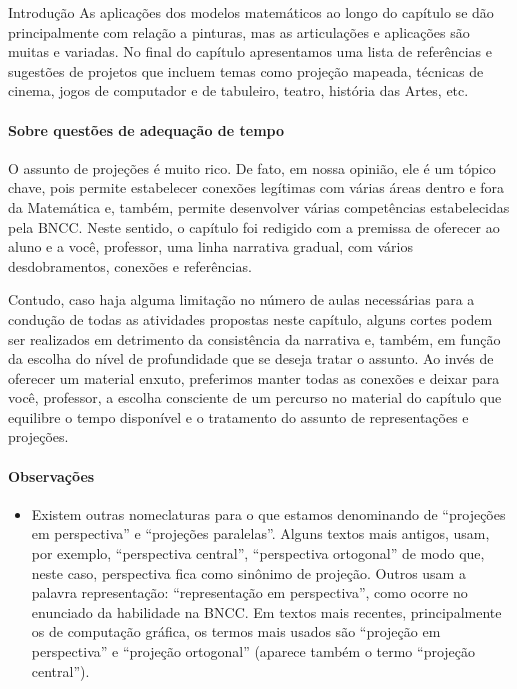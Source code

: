 \begin{apresentacao}{Introdução}
As aplicações dos modelos matemáticos ao longo do capítulo se dão principalmente com relação a pinturas, mas as articulações e aplicações são muitas e variadas. No final do capítulo apresentamos uma lista de referências e sugestões de projetos que incluem temas como projeção mapeada, técnicas de cinema, jogos de computador e de tabuleiro, teatro, história das Artes, etc.

\paragraph{Sobre questões de adequação de tempo}

O assunto de projeções é muito rico. De fato, em nossa opinião, ele é um tópico chave, pois permite estabelecer conexões legítimas com várias áreas dentro e fora da Matemática e, também, permite desenvolver várias competências estabelecidas pela BNCC. Neste sentido, o capítulo foi redigido com a premissa de oferecer ao aluno e a você, professor, uma linha narrativa gradual, com vários desdobramentos, conexões e referências.

Contudo, caso haja alguma limitação no número de aulas necessárias para a condução de todas as atividades propostas neste capítulo, alguns cortes podem ser realizados em detrimento da consistência da narrativa e, também, em função da escolha do nível de profundidade que se deseja tratar o assunto. Ao invés de oferecer um material enxuto, preferimos manter todas as conexões e deixar para você, professor, a escolha consciente de um percurso no material do capítulo que equilibre o tempo disponível e o tratamento do assunto de representações e projeções.

\paragraph{Observações}
\begin{itemize}
\item {} 
Existem outras nomeclaturas para o que estamos denominando de “projeções em perspectiva” e “projeções paralelas”. Alguns textos mais antigos, usam, por exemplo, “perspectiva central”, “perspectiva ortogonal” de modo que, neste caso, perspectiva fica como sinônimo de projeção. Outros usam a palavra representação: “representação em perspectiva”, como ocorre no enunciado da habilidade na BNCC. Em textos mais recentes, principalmente os de computação gráfica, os termos mais usados são “projeção em perspectiva” e “projeção ortogonal” (aparece também o termo “projeção central”).


\end{itemize}
\end{apresentacao}
